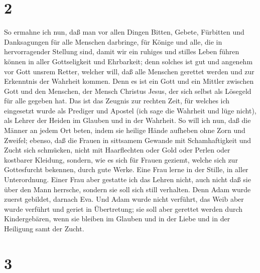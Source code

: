 \hypertarget{section-1}{%
\section{2}\label{section-1}}

 So ermahne ich nun, daß man vor allen Dingen Bitten,
Gebete, Fürbitten und Danksagungen für alle Menschen darbringe,
 für Könige und alle, die in hervorragender Stellung sind,
damit wir ein ruhiges und stilles Leben führen können in aller
Gottseligkeit und Ehrbarkeit;  denn solches ist gut und
angenehm vor Gott unsrem Retter,  welcher will, daß alle
Menschen gerettet werden und zur Erkenntnis der Wahrheit kommen.
 Denn es ist ein Gott und ein Mittler zwischen Gott und
den Menschen, der Mensch Christus Jesus,  der sich selbst
als Lösegeld für alle gegeben hat. Das ist das Zeugnis zur rechten Zeit,
 für welches ich eingesetzt wurde als Prediger und Apostel
(ich sage die Wahrheit und lüge nicht), als Lehrer der Heiden im Glauben
und in der Wahrheit.  So will ich nun, daß die Männer an
jedem Ort beten, indem sie heilige Hände aufheben ohne Zorn und Zweifel;
 ebenso, daß die Frauen in sittsamem Gewande mit
Schamhaftigkeit und Zucht sich schmücken, nicht mit Haarflechten oder
Gold oder Perlen oder kostbarer Kleidung,  sondern, wie
es sich für Frauen geziemt, welche sich zur Gottesfurcht bekennen, durch
gute Werke.  Eine Frau lerne in der Stille, in aller
Unterordnung.  Einer Frau aber gestatte ich das Lehren
nicht, auch nicht daß sie über den Mann herrsche, sondern sie soll sich
still verhalten.  Denn Adam wurde zuerst gebildet,
darnach Eva.  Und Adam wurde nicht verführt, das Weib
aber wurde verführt und geriet in Übertretung;  sie soll
aber gerettet werden durch Kindergebären, wenn sie bleiben im Glauben
und in der Liebe und in der Heiligung samt der Zucht.

\hypertarget{section-2}{%
\section{3}\label{section-2}}

